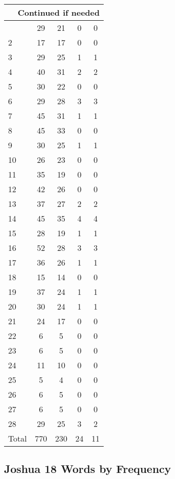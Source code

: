 \begin{center}
\begin{longtable}{l|c|c|c|c}
\hline \multicolumn{5}{|r|}{{Continued if needed}} \\ \hline
\endfoot 
1 & 29 & 21 & 0 & 0\\ \hline
2 & 17 & 17 & 0 & 0\\ \hline
3 & 29 & 25 & 1 & 1\\ \hline
4 & 40 & 31 & 2 & 2\\ \hline
5 & 30 & 22 & 0 & 0\\ \hline
6 & 29 & 28 & 3 & 3\\ \hline
7 & 45 & 31 & 1 & 1\\ \hline
8 & 45 & 33 & 0 & 0\\ \hline
9 & 30 & 25 & 1 & 1\\ \hline
10 & 26 & 23 & 0 & 0\\ \hline
11 & 35 & 19 & 0 & 0\\ \hline
12 & 42 & 26 & 0 & 0\\ \hline
13 & 37 & 27 & 2 & 2\\ \hline
14 & 45 & 35 & 4 & 4\\ \hline
15 & 28 & 19 & 1 & 1\\ \hline
16 & 52 & 28 & 3 & 3\\ \hline
17 & 36 & 26 & 1 & 1\\ \hline
18 & 15 & 14 & 0 & 0\\ \hline
19 & 37 & 24 & 1 & 1\\ \hline
20 & 30 & 24 & 1 & 1\\ \hline
21 & 24 & 17 & 0 & 0\\ \hline
22 & 6 & 5 & 0 & 0\\ \hline
23 & 6 & 5 & 0 & 0\\ \hline
24 & 11 & 10 & 0 & 0\\ \hline
25 & 5 & 4 & 0 & 0\\ \hline
26 & 6 & 5 & 0 & 0\\ \hline
27 & 6 & 5 & 0 & 0\\ \hline
28 & 29 & 25 & 3 & 2\\ \hline
Total & 770 & 230 & 24 & 11
\end{longtable}
\end{center}





\subsection{Joshua 18 Words by Frequency}


\normalsize
 
